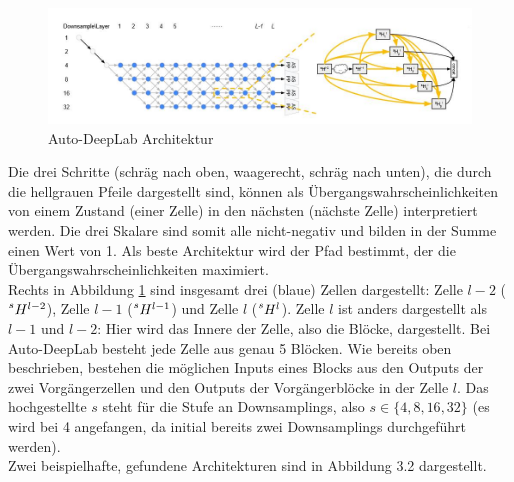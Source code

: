 \begin{figure}[H]
	\centering
	\includegraphics[width=1\textwidth]{Pictures/AutoDeepLab/Autodeeplab1.jpg}
	\caption{Auto-DeepLab Architektur \cite{autodeeplabPaper}}
	\label{pic:autodeeplab_Architektur}
\end{figure}

Die drei Schritte (schräg nach oben, waagerecht, schräg nach unten), die durch die hellgrauen Pfeile dargestellt sind, können als Übergangswahrscheinlichkeiten von einem Zustand (einer Zelle) in den nächsten (nächste Zelle) interpretiert werden. Die drei Skalare sind somit alle nicht-negativ und bilden in der Summe einen Wert von 1. Als beste Architektur wird der Pfad bestimmt, der die Übergangswahrscheinlichkeiten maximiert.\\[0.3cm]
Rechts in Abbildung \ref{pic:autodeeplab_Architektur} sind insgesamt drei (blaue) Zellen dargestellt: Zelle $l-2$ ($\prescript{s}{}{H}^{l-2}$), Zelle $l-1$ ($\prescript{s}{}{H}^{l-1}$) und Zelle $l$ ($\prescript{s}{}{H}^{l}$). Zelle $l$ ist anders dargestellt als $l-1$ und $l-2$: Hier wird das Innere der Zelle, also die Blöcke, dargestellt. Bei Auto-DeepLab besteht jede Zelle aus genau 5 Blöcken. Wie bereits oben beschrieben, bestehen die möglichen Inputs eines Blocks aus den Outputs der zwei Vorgängerzellen und den Outputs der Vorgängerblöcke in der Zelle $l$. Das hochgestellte $s$ steht für die Stufe an Downsamplings, also $s \in \{4,8,16,32\}$ (es wird bei 4 angefangen, da initial bereits zwei Downsamplings durchgeführt werden).\\[0.3cm]
Zwei beispielhafte, gefundene Architekturen sind in Abbildung 3.2 dargestellt.\\

